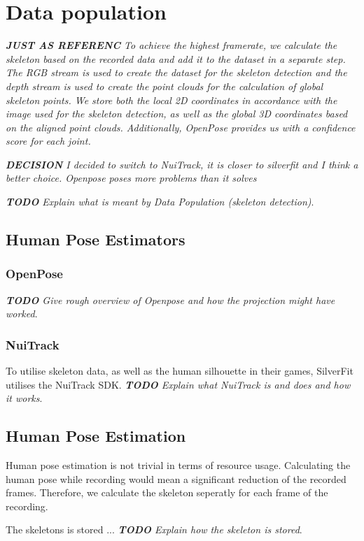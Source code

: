 \section{Data population}

\textit{\textbf{JUST AS REFERENC} To achieve the highest framerate, we calculate the skeleton based on the recorded data and add it to the dataset in a separate step. The RGB stream is used to create the dataset for the skeleton detection and the depth stream is used to create the point clouds for the calculation of global skeleton points. We store both the local 2D coordinates in accordance with the image used for the skeleton detection, as well as the global 3D coordinates based on the aligned point clouds. Additionally, OpenPose provides us with a confidence score for each joint.}

\textit{\textbf{DECISION} I decided to switch to NuiTrack, it is closer to silverfit and I think a better choice. Openpose poses more problems than it solves}

\textit{\textbf{TODO} Explain what is meant by Data Population (skeleton detection)}.

\subsection{Human Pose Estimators}

\subsubsection{OpenPose}

\textit{\textbf{TODO} Give rough overview of Openpose and how the projection might have worked}.

\subsubsection{NuiTrack}

To utilise skeleton data, as well as the human silhouette in their games, SilverFit utilises the NuiTrack SDK.  \textit{\textbf{TODO} Explain what NuiTrack is and does and how it works}.

\subsection{Human Pose Estimation}

Human pose estimation is not trivial in terms of resource usage. Calculating the human pose while recording would mean a significant reduction of the recorded frames. Therefore, we calculate the skeleton seperatly for each frame of the recording.

The skeletons is stored ... \textit{\textbf{TODO} Explain how the skeleton is stored}.
